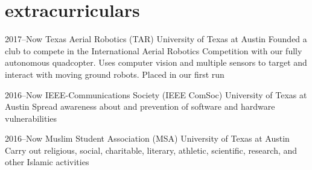 \documentclass[]{friggeri-cv} %
\begin{document}
\section{extracurriculars}

\begin{entrylist}

	\entry
	{2017--Now}
	{Texas Aerial Robotics (TAR)}
	{University of Texas at Austin}
	{Founded a club to compete in the International Aerial Robotics Competition with our fully autonomous quadcopter. Uses computer vision and multiple sensors to target and interact with moving ground robots. Placed  in our first run}







	\entry
	{2016--Now}
	{IEEE-Communications Society (IEEE ComSoc)}
	{University of Texas at Austin}
	{Spread awareness about and prevention of software and hardware vulnerabilities}


	\entry
	{2016--Now}
	{Muslim Student Association (MSA)}
	{University of Texas at Austin}
	{Carry out religious, social, charitable, literary, athletic, scientific, research, and other Islamic activities}




\end{entrylist}
\end{document}
